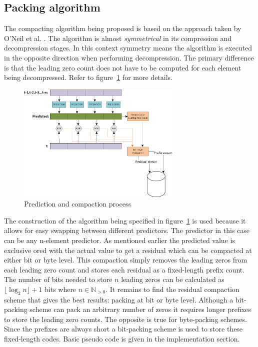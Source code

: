 \subsection{Packing algorithm}
The compacting algorithm being proposed is based on the approach taken by O'Neil et al. \cite{O'Neil:2011:FDC:1964179.1964189}. The algorithm is almost \textit{symmetrical} in its compression and 
decompression stages. In this context symmetry means the algorithm is executed in the opposite direction when performing decompression. The primary difference is that the leading 
zero count does not have to be computed for each element being decompressed. Refer to figure~\ref{PACKING_ALGORITHM} for more details.
\begin{figure}[h!]
\begin{mdframed}
 \centering
 \includegraphics[width=0.7\textwidth]{Thesis_Alg.png}
 \caption{Prediction and compaction process}
 \label{PACKING_ALGORITHM}
\end{mdframed}
\end{figure}
The construction of the algorithm being specified in figure~\ref{PACKING_ALGORITHM} is used because it allows for easy swapping between different predictors. The predictor in this case 
can be any n-element predictor. As mentioned earlier the predicted value is exclusive ored with the actual value to get a residual which can be compacted at either bit or byte level. This 
compaction simply removes the leading zeros from each leading zero count and stores each residual as a fixed-length prefix count. The number of bits needed to store $n$ leading 
zeros can be calculated as $\lfloor\log_2n\rfloor+1$ bits where $n\in\mathbb{N}_{>0}$. It remains to find the residual compaction scheme that gives the best results: packing at 
bit or byte level. Although a bit-packing scheme can pack an arbitrary number of zeros it requires longer prefixes to store the leading zero counts. The opposite is true 
for byte-packing schemes. Since the prefixes are always short a bit-packing scheme is used to store these fixed-length codes. Basic pseudo code is given in the implementation section.

